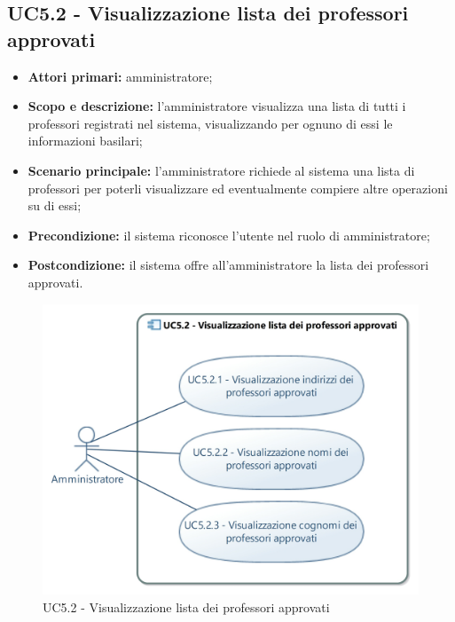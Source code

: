 \documentclass[AnalisiDeiRequisiti.tex]{subfiles}
\begin{document}
\subsection{UC5.2 - Visualizzazione lista dei professori approvati}
\begin{itemize}
	\item \textbf{Attori primari:} amministratore;
	\item \textbf{Scopo e descrizione:} l'amministratore visualizza una lista di tutti i professori registrati nel sistema, visualizzando per ognuno di essi le informazioni basilari;
	\item \textbf{Scenario principale:} l'amministratore richiede al sistema una lista di professori per poterli visualizzare ed eventualmente compiere altre operazioni su di essi;
	\item \textbf{Precondizione:} il sistema riconosce l'utente nel ruolo di amministratore; 
	\item \textbf{Postcondizione:} il sistema offre all'amministratore la lista dei professori approvati.
\end{itemize}
\begin{figure}[H]
	\centering
	\includegraphics[width=0.8\linewidth]{UC5_2.jpg}
	\caption{UC5.2 - Visualizzazione lista dei professori approvati}
	\label{fig:UC5.2 - Visualizzazione lista dei professori approvati}
\end{figure}
\end{document}
